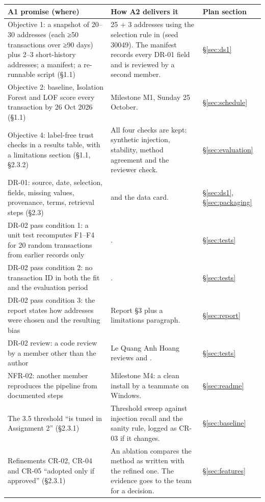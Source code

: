 \begin{longtable}{@{}L{4.6cm}L{6.4cm}L{3.6cm}@{}}
\toprule
\textbf{A1 promise (where)} & \textbf{How A2 delivers it} & \textbf{Plan section} \\
\midrule
\endhead
Objective 1: a snapshot of 20--30 addresses (each ≥50 transactions over ≥90 days) plus 2--3 short-history addresses; a manifest; a re-runnable script (§1.1) &
25 + 3 addresses using the selection rule in  (seed 30049). The manifest records every DR-01 field and is reviewed by a second member. & \S\ref{sec:ds1} \\
Objective 2: baseline, Isolation Forest and LOF score every transaction by 26 Oct 2026 (§1.1) & Milestone M1, Sunday 25 October. & \S\ref{sec:schedule} \\
Objective 4: label-free trust checks in a results table, with a limitations section (§1.1, §2.3.2) &
All four checks are kept: synthetic injection, stability, method agreement and the reviewer check. & \S\ref{sec:evaluation} \\
DR-01: source, date, selection, fields, missing values, provenance, terms, retrieval steps (§2.3) &  and the data card. & \S\ref{sec:ds1}, \S\ref{sec:packaging} \\
DR-02 pass condition 1: a unit test recomputes F1--F4 for 20 random transactions from earlier records only & . & \S\ref{sec:tests} \\
DR-02 pass condition 2: no transaction ID in both the fit and the evaluation period & . & \S\ref{sec:tests} \\
DR-02 pass condition 3: the report states how addresses were chosen and the resulting bias & Report §3 plus a limitations paragraph. & \S\ref{sec:report} \\
DR-02 review: a code review by a member other than the author & Le Quang Anh Hoang reviews  and . & \S\ref{sec:tests} \\
NFR-02: another member reproduces the pipeline from documented steps & Milestone M4: a clean install by a teammate on Windows. & \S\ref{sec:readme} \\
The 3.5 threshold ``is tuned in Assignment 2'' (§2.3.1) & Threshold sweep against injection recall and the sanity rule, logged as CR-03 if it changes. & \S\ref{sec:baseline} \\
Refinements CR-02, CR-04 and CR-05 ``adopted only if approved'' (§2.3.1) & An ablation compares the method as written with the refined one. The evidence goes to the team for a decision. & \S\ref{sec:features} \\

\end{longtable}
